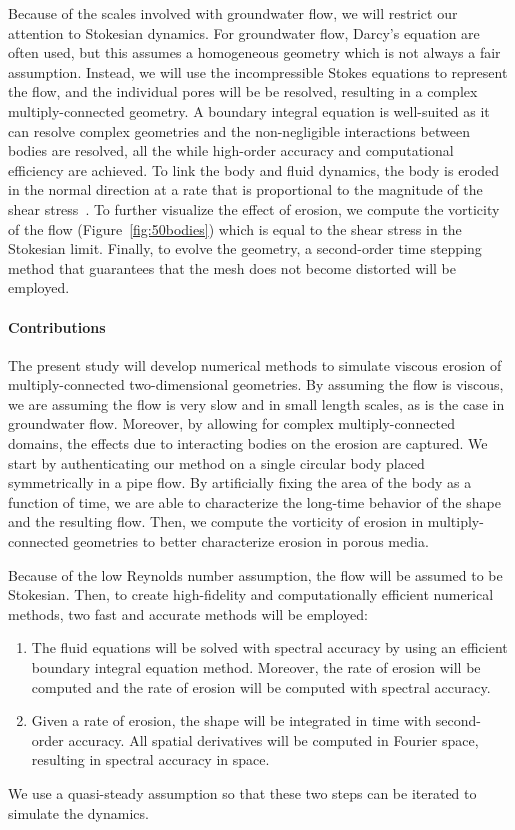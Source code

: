 \documentclass[preprint, 10pt]{elsarticle}
\begin{document}
Because of the scales involved with groundwater flow, we will restrict
our attention to Stokesian dynamics.  For groundwater flow, Darcy's
equation are often used, but this assumes a homogeneous geometry which
is not always a fair assumption.  Instead, we will use the
incompressible Stokes equations to represent the flow, and the
individual pores will be be resolved, resulting in a complex
multiply-connected geometry.  A boundary integral equation is
well-suited as it can resolve complex geometries and the non-negligible
interactions between bodies are resolved, all the while high-order
accuracy and computational efficiency are achieved. To link the body and
fluid dynamics, the body is eroded in the normal direction at a rate
that is proportional to the magnitude of the shear
stress~\cite{ris-moo-chi-she-zha2012}.  To further visualize the effect
of erosion, we compute the vorticity of the flow
(Figure~\ref{fig:50bodies}) which is equal to the shear stress in the
Stokesian limit.  Finally, to evolve the geometry, a second-order time
stepping method that guarantees that the mesh does not become distorted
will be employed.

\paragraph{Contributions} The present study will develop numerical
methods to simulate viscous erosion of multiply-connected
two-dimensional geometries.  By assuming the flow is viscous, we are
assuming the flow is very slow and in small length scales, as is the
case in groundwater flow.  Moreover, by allowing for complex
multiply-connected domains, the effects due to interacting bodies on the
erosion are captured.  We start by authenticating our method on a single
circular body placed symmetrically in a pipe flow.  By artificially
fixing the area of the body as a function of time, we are able to
characterize the long-time behavior of the shape and the resulting flow.
Then, we compute the vorticity of erosion in multiply-connected
geometries to better characterize erosion in porous media. 

Because of the low Reynolds number assumption, the flow will be assumed
to be Stokesian.  Then, to create high-fidelity and computationally
efficient numerical methods, two fast and accurate methods will be
employed:
\begin{enumerate}
  \item The fluid equations will be solved with spectral accuracy by
  using an efficient boundary integral equation method. Moreover, the
  rate of erosion will be computed and the rate of erosion will be
  computed with spectral accuracy.
  \item Given a rate of erosion, the shape will be integrated in time
  with second-order accuracy.  All spatial derivatives will be computed
  in Fourier space, resulting in spectral accuracy in space.
\end{enumerate}
We use a quasi-steady assumption so that these two steps can be iterated
to simulate the dynamics.
\end{document}
